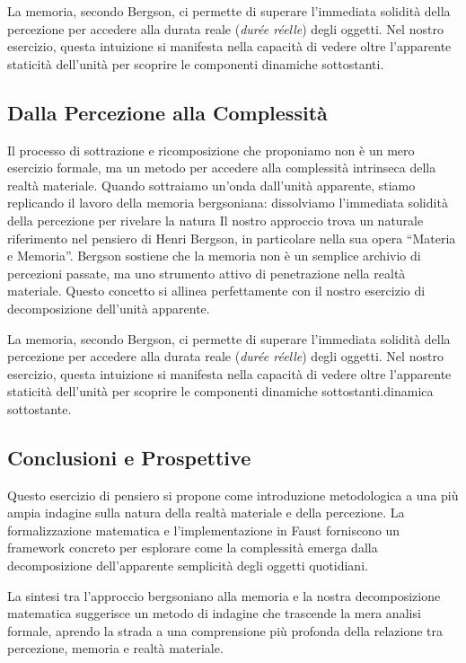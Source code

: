 \documentclass[a4paper,11pt]{article}
\begin{document}
La memoria, secondo Bergson, ci permette di superare l'immediata
solidità della percezione per accedere alla durata reale (\emph{durée
réelle}) degli oggetti. Nel nostro esercizio, questa intuizione si
manifesta nella capacità di vedere oltre l'apparente staticità
dell'unità per scoprire le componenti dinamiche sottostanti.

\subsection{Dalla Percezione alla
Complessità}\label{dalla-percezione-alla-complessituxe0}

Il processo di sottrazione e ricomposizione che proponiamo non è un mero
esercizio formale, ma un metodo per accedere alla complessità intrinseca
della realtà materiale. Quando sottraiamo un'onda dall'unità apparente,
stiamo replicando il lavoro della memoria bergsoniana: dissolviamo
l'immediata solidità della percezione per rivelare la natura Il nostro
approccio trova un naturale riferimento nel pensiero di Henri Bergson,
in particolare nella sua opera ``Materia e Memoria''. Bergson sostiene
che la memoria non è un semplice archivio di percezioni passate, ma uno
strumento attivo di penetrazione nella realtà materiale. Questo concetto
si allinea perfettamente con il nostro esercizio di decomposizione
dell'unità apparente.

La memoria, secondo Bergson, ci permette di superare l'immediata
solidità della percezione per accedere alla durata reale (\emph{durée
réelle}) degli oggetti. Nel nostro esercizio, questa intuizione si
manifesta nella capacità di vedere oltre l'apparente staticità
dell'unità per scoprire le componenti dinamiche sottostanti.dinamica
sottostante.

\subsection{Conclusioni e Prospettive}\label{conclusioni-e-prospettive}

Questo esercizio di pensiero si propone come introduzione metodologica a
una più ampia indagine sulla natura della realtà materiale e della
percezione. La formalizzazione matematica e l'implementazione in Faust
forniscono un framework concreto per esplorare come la complessità
emerga dalla decomposizione dell'apparente semplicità degli oggetti
quotidiani.

La sintesi tra l'approccio bergsoniano alla memoria e la nostra
decomposizione matematica suggerisce un metodo di indagine che trascende
la mera analisi formale, aprendo la strada a una comprensione più
profonda della relazione tra percezione, memoria e realtà materiale.
\end{document}

